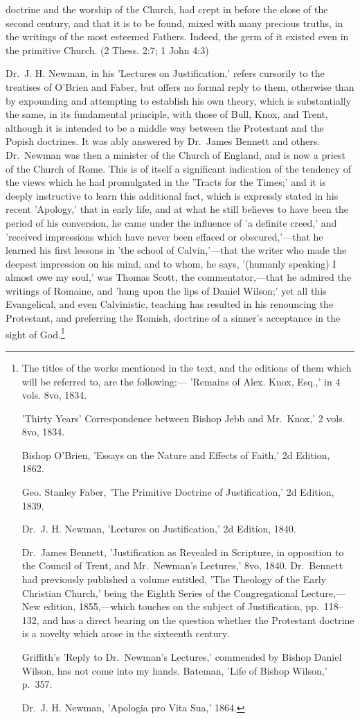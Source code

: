 \documentclass[
]{book}
\begin{document}
doctrine and the worship of the Church, had crept in before the close of the second century, and that it is to be found, mixed with many precious truths, in the writings of the most esteemed Fathers. Indeed, the germ of it existed even in the primitive Church. (2 Thess. 2:7; 1 John 4:3)

Dr.~J. H. Newman, in his 'Lectures on Justification,' refers cursorily to the treatises of O'Brien and Faber, but offers no formal reply to them, otherwise than by expounding and attempting to establish his own theory, which is substantially the same, in its fundamental principle, with those of Bull, Knox, and Trent, although it is intended to be a middle way between the Protestant and the Popish doctrines. It was ably answered by Dr.~James Bennett and others. Dr.~Newman was then a minister of the Church of England, and is now a priest of the Church of Rome. This is of itself a significant indication of the tendency of the views which he had promulgated in the 'Tracts for the Times;' and it is deeply instructive to learn this additional fact, which is expressly stated in his recent 'Apology,' that in early life, and at what he still believes to have been the period of his conversion, he came under the influence of 'a definite creed,' and 'received impressions which have never been effaced or obscured,'---that he learned his first lessons in 'the school of Calvin,'---that the writer who made the deepest impression on his mind, and to whom, he says, '(humanly speaking) I almost owe my soul,' was Thomas Scott, the commentator,---that he admired the writings of Romaine, and 'hung upon the lips of Daniel Wilson;' yet all this Evangelical, and even Calvinistic, teaching has resulted in his renouncing the Protestant, and preferring the Romish, doctrine of a sinner's acceptance in the sight of God.\footnote{The titles of the works mentioned in the text, and the editions of them which will be referred to, are the following:---
  'Remains of Alex. Knox, Esq.,' in 4 vols. 8vo, 1834.

  'Thirty Years' Correspondence between Bishop Jebb and Mr.~Knox,' 2 vols. 8vo, 1834.

  Bishop O'Brien, 'Essays on the Nature and Effects of Faith,' 2d Edition, 1862.

  Geo. Stanley Faber, 'The Primitive Doctrine of Justification,' 2d Edition, 1839.

  Dr.~J. H. Newman, 'Lectures on Justification,' 2d Edition, 1840.

  Dr.~James Bennett, 'Justification as Revealed in Scripture, in opposition to the Council of Trent, and Mr.~Newman's Lectures,' 8vo, 1840. Dr.~Bennett had previously published a volume entitled, 'The Theology of the Early Christian Church,' being the Eighth Series of the Congregational Lecture,---New edition, 1855,---which touches on the subject of Justification, pp.~118--132, and has a direct bearing on the question whether the Protestant doctrine is a novelty which arose in the sixteenth century.

  Griffith's 'Reply to Dr.~Newman's Lectures,' commended by Bishop Daniel Wilson, has not come into my hands. Bateman, 'Life of Bishop Wilson,' p.~357.

  Dr.~J. H. Newman, 'Apologia pro Vita Sua,' 1864.}
\end{document}
